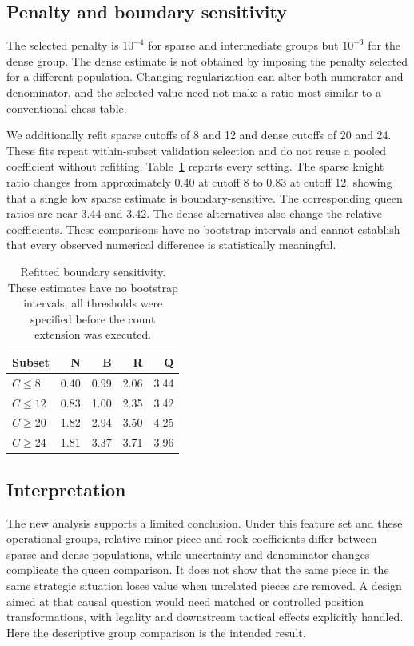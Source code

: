 \subsection{Penalty and boundary sensitivity}
The selected penalty is $10^{-4}$ for sparse and intermediate groups but $10^{-3}$ for the dense group. The dense estimate is not obtained by imposing the penalty selected for a different population. Changing regularization can alter both numerator and denominator, and the selected value need not make a ratio most similar to a conventional chess table.

We additionally refit sparse cutoffs of 8 and 12 and dense cutoffs of 20 and 24. These fits repeat within-subset validation selection and do not reuse a pooled coefficient without refitting. Table~\ref{tab:countsensitivity} reports every setting. The sparse knight ratio changes from approximately 0.40 at cutoff 8 to 0.83 at cutoff 12, showing that a single low sparse estimate is boundary-sensitive. The corresponding queen ratios are near 3.44 and 3.42. The dense alternatives also change the relative coefficients. These comparisons have no bootstrap intervals and cannot establish that every observed numerical difference is statistically meaningful.
\begin{table}[htbp]\centering
\small
\caption{Refitted boundary sensitivity. These estimates have no bootstrap intervals; all thresholds were specified before the count extension was executed.}\label{tab:countsensitivity}
\begin{tabular}{lrrrr}
\toprule
Subset & N & B & R & Q\\\midrule
$C\leq 8$ & 0.40 & 0.99 & 2.06 & 3.44\\
$C\leq 12$ & 0.83 & 1.00 & 2.35 & 3.42\\
$C\geq 20$ & 1.82 & 2.94 & 3.50 & 4.25\\
$C\geq 24$ & 1.81 & 3.37 & 3.71 & 3.96\\
\bottomrule\end{tabular}\end{table}

\subsection{Interpretation}
The new analysis supports a limited conclusion. Under this feature set and these operational groups, relative minor-piece and rook coefficients differ between sparse and dense populations, while uncertainty and denominator changes complicate the queen comparison. It does not show that the same piece in the same strategic situation loses value when unrelated pieces are removed. A design aimed at that causal question would need matched or controlled position transformations, with legality and downstream tactical effects explicitly handled. Here the descriptive group comparison is the intended result.
